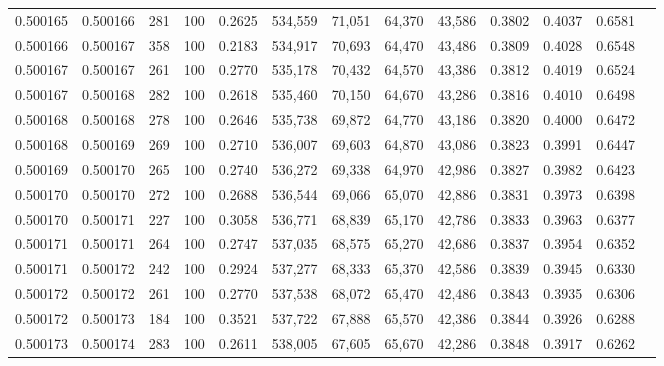 \begin{tabular}{rrrrrrrrrrrrr}
0.500165 & 0.500166 &   281 & 100 &                                     0.2625 & 534,559 &  71,051 &  64,370 &  43,586 & 0.3802 & 0.4037 & 0.6581 \\
0.500166 & 0.500167 &   358 & 100 &                                     0.2183 & 534,917 &  70,693 &  64,470 &  43,486 & 0.3809 & 0.4028 & 0.6548 \\
0.500167 & 0.500167 &   261 & 100 &                                     0.2770 & 535,178 &  70,432 &  64,570 &  43,386 & 0.3812 & 0.4019 & 0.6524 \\
0.500167 & 0.500168 &   282 & 100 &                                     0.2618 & 535,460 &  70,150 &  64,670 &  43,286 & 0.3816 & 0.4010 & 0.6498 \\
0.500168 & 0.500168 &   278 & 100 &                                     0.2646 & 535,738 &  69,872 &  64,770 &  43,186 & 0.3820 & 0.4000 & 0.6472 \\
0.500168 & 0.500169 &   269 & 100 &                                     0.2710 & 536,007 &  69,603 &  64,870 &  43,086 & 0.3823 & 0.3991 & 0.6447 \\
0.500169 & 0.500170 &   265 & 100 &                                     0.2740 & 536,272 &  69,338 &  64,970 &  42,986 & 0.3827 & 0.3982 & 0.6423 \\
0.500170 & 0.500170 &   272 & 100 &                                     0.2688 & 536,544 &  69,066 &  65,070 &  42,886 & 0.3831 & 0.3973 & 0.6398 \\
0.500170 & 0.500171 &   227 & 100 &                                     0.3058 & 536,771 &  68,839 &  65,170 &  42,786 & 0.3833 & 0.3963 & 0.6377 \\
0.500171 & 0.500171 &   264 & 100 &                                     0.2747 & 537,035 &  68,575 &  65,270 &  42,686 & 0.3837 & 0.3954 & 0.6352 \\
0.500171 & 0.500172 &   242 & 100 &                                     0.2924 & 537,277 &  68,333 &  65,370 &  42,586 & 0.3839 & 0.3945 & 0.6330 \\
0.500172 & 0.500172 &   261 & 100 &                                     0.2770 & 537,538 &  68,072 &  65,470 &  42,486 & 0.3843 & 0.3935 & 0.6306 \\
0.500172 & 0.500173 &   184 & 100 &                                     0.3521 & 537,722 &  67,888 &  65,570 &  42,386 & 0.3844 & 0.3926 & 0.6288 \\
0.500173 & 0.500174 &   283 & 100 &                                     0.2611 & 538,005 &  67,605 &  65,670 &  42,286 & 0.3848 & 0.3917 & 0.6262 \\

\end{tabular}
